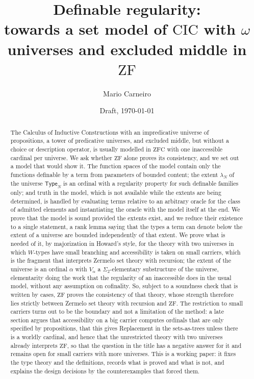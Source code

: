 \documentclass[10pt]{article}
\newcommand{\Type}{\mathsf{Type}}
\newcommand{\CIC}{\mathrm{CIC}}
\newcommand{\ZF}{\mathrm{ZF}}
\newcommand{\ZFC}{\mathrm{ZFC}}
\begin{document}
\title{Definable regularity:\\
  \large towards a set model of $\CIC$ with $\omega$ universes and excluded middle in $\ZF$}
\author{Mario Carneiro}
\date{Draft, \today}
\maketitle

\begin{abstract}
The Calculus of Inductive Constructions with an impredicative universe
of propositions, a tower of predicative universes, and excluded middle,
but without a choice or description operator, is usually modelled in
$\ZFC$ with one inaccessible cardinal per universe. We ask whether $\ZF$
alone proves its consistency, and we set out a model that would show
it. The function spaces of the model contain only the functions
definable by a term from parameters of bounded content; the extent
$\lambda_N$ of the universe $\Type_N$ is an ordinal with a regularity
property for such definable families only; and truth in the model,
which is not available while the extents are being determined, is
handled by evaluating terms relative to an arbitrary oracle for the
class of admitted elements and instantiating the oracle with the model
itself at the end. We prove that the model is sound provided the
extents exist, and we reduce their existence to a single statement, a
rank lemma saying that the types a term can denote below the extent of
a universe are bounded independently of that extent. We prove what is
needed of it, by majorization in Howard's style, for the theory with two
universes in which $W$-types have small branching and accessibility is
taken on small carriers, which is the fragment that interprets Zermelo
set theory with recursion; the extent of the universe is an ordinal
$\alpha$ with $V_\alpha$ a $\Sigma_2$-elementary substructure of the universe,
elementarity doing the work that the regularity of an inaccessible does
in the usual model, without any assumption on cofinality. So, subject
to a soundness check that is written by cases, $\ZF$ proves the
consistency of that theory, whose strength therefore lies strictly
between Zermelo set theory with recursion and $\ZF$. The restriction
to small carriers turns out to be the boundary and not a limitation of
the method: a late section argues that accessibility on a big carrier
computes ordinals that are only specified by propositions, that this
gives Replacement in the sets-as-trees unless there is a worldly
cardinal, and hence that the
unrestricted theory with two universes already interprets $\ZF$, so
that the question in the title has a negative answer for it and remains
open for small carriers with more universes. This is a working paper: it
fixes the type theory and the
definitions, records what is proved and what is not, and explains the
design decisions by the counterexamples that forced them.
\end{abstract}
\end{document}
